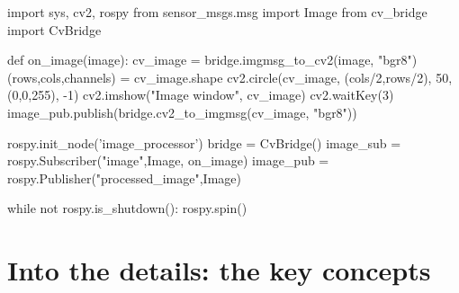 \documentclass[compress]{beamer}
\begin{document}
\begin{frame}[containsverbatim]{}

\begin{pythoncode}
import sys, cv2, rospy
from sensor_msgs.msg import Image
from cv_bridge import CvBridge

def on_image(image):
    cv_image = bridge.imgmsg_to_cv2(image, "bgr8")
    (rows,cols,channels) = cv_image.shape
    cv2.circle(cv_image, (cols/2,rows/2), 50,(0,0,255), -1)
    cv2.imshow("Image window", cv_image)
    cv2.waitKey(3)
    image_pub.publish(bridge.cv2_to_imgmsg(cv_image, "bgr8"))

rospy.init_node('image_processor')
bridge = CvBridge()
image_sub = rospy.Subscriber("image",Image, on_image)
image_pub = rospy.Publisher("processed_image",Image)

while not rospy.is_shutdown():
    rospy.spin()
\end{pythoncode}

\end{frame}

\begin{frame}[containsverbatim]{}


\end{frame}






\section{Into the details: the key concepts}
\end{document}
